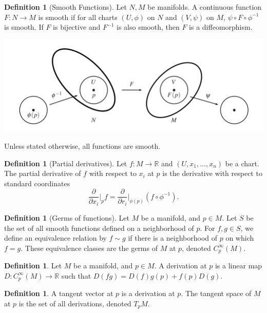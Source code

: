 \documentclass[]{article}
\theoremstyle{definition}
\theoremstyle{definition}
\newtheorem{definition}[theorem]{Definition} %
\begin{document}
\begin{definition}[Smooth Functions]
    Let $N,M$ be manifolds. A continuous function $F:N\rightarrow M$ is smooth if for all charts $(U, \phi)$ on $N$ and $(V, \psi)$ on $M$, $\psi\circ F\circ \phi^{-1}$ is smooth. If $F$ is bijective and $F^{-1}$ is also smooth, then $F$ is a diffeomorphism.
\end{definition}

\begin{center}
    \includegraphics[scale=0.5]{smooth_function.PNG}
\end{center}

Unless stated otherwise, all functions are smooth.

\begin{definition}[Partial derivatives]
    Let $f:M \rightarrow \mathbb{R}$ and $(U, x_1, \dots, x_n)$ be a chart. The partial derivative of $f$ with respect to $x_i$ at $p$ is the derivative with respect to standard coordinates
    \[\frac{\partial}{\partial x_i}\bigg|_p f=\frac{\partial}{\partial r_i}\bigg|_{\phi(p)}(f\circ\phi^{-1}).\]
\end{definition}

\begin{definition}[Germs of functions]
    Let $M$ be a manifold, and $p\in M$. Let $S$ be the set of all smooth functions defined on a neighborhood of $p$. For $f, g\in S$, we define an equivalence relation by $f\sim g$ if there is a neighborhood of $p$ on which $f=g$. These equivalence classes are the germs of $M$ at $p$, denoted $C^\infty_p(M)$.
\end{definition}

\begin{definition}
    Let $M$ be a manifold, and $p\in M$. A derivation at $p$ is a linear map $D:C^\infty_p(M) \rightarrow \mathbb{R}$ such that $D(fg)=D(f)g(p)+f(p)D(g)$.
\end{definition}

\begin{definition}
    A tangent vector at $p$ is a derivation at $p$. The tangent space of $M$ at $p$ is the set of all derivations, denoted $T_pM$.
\end{definition}
\end{document}
